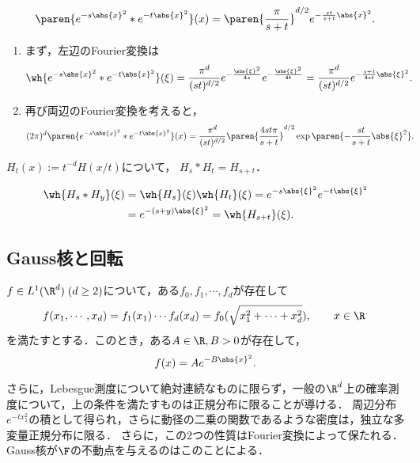 \documentclass[uplatex,dvipdfmx]{jsreport}
\begin{document}
\begin{proposition}
    \[\paren{e^{-s\abs{x}^2}*e^{-t\abs{x}^2}}(x)=\paren{\frac{\pi}{s+t}}^{d/2}e^{-\frac{st}{s+t}\abs{x}^2}.\]
\end{proposition}
\begin{Proof}\mbox{}
    \begin{enumerate}[{Step}1]
        \item まず，左辺のFourier変換は
        \begin{align*}
            \wh{e^{-s\abs{x}^2}*e^{-t\abs{x}^2}}(\xi)&=\frac{\pi^d}{(st)^{d/2}}e^{-\frac{\abs{\xi}^2}{4s}}e^{-\frac{\abs{\xi}^2}{4t}}=\frac{\pi^d}{(st)^{d/2}}e^{-\frac{s+t}{4st}\abs{\xi}^2}.
        \end{align*}
        \item 再び両辺のFourier変換を考えると，
        \begin{align*}
            (2\pi)^d\paren{e^{-s\abs{x}^2}*e^{-t\abs{x}^2}}(x)&=\frac{\pi^d}{(st)^{d/2}}\paren{\frac{4st\pi}{s+t}}^{d/2}\exp\paren{-\frac{st}{s+t}\abs{\xi}^2}.
        \end{align*}
    \end{enumerate}
\end{Proof}

\begin{proposition}[熱核の半群性]
    $H_t(x):=t^{-d}H(x/t)$について，
    $H_s*H_t=H_{s+t}$．
\end{proposition}
\begin{Proof}
    \begin{align*}
        \wh{H_s*H_y}(\xi)&=\wh{H_s}(\xi)\wh{H_t}(\xi)=e^{-s\abs{\xi}^2}e^{-t\abs{\xi}^2}\\
        &=e^{-(s+y)\abs{\xi}^2}=\wh{H_{s+t}}(\xi).
    \end{align*}
\end{Proof}

\subsection{Gauss核と回転}


\begin{proposition}
    $f\in L^1(\R^d)\;(d\ge2)$について，ある$f_0,f_1,\cdots,f_d$が存在して
    \[f(x_1,\cdots,x_d)=f_1(x_1)\cdots f_d(x_d)=f_0(\sqrt{x_1^2+\cdots+x_d^2}),\qquad x\in\R^.\]
    を満たすとする．このとき，ある$A\in\R,B>0$が存在して，
    \[f(x)=Ae^{-B\abs{x}^2}.\]
\end{proposition}
\begin{remarks}
    さらに，Lebesgue測度について絶対連続なものに限らず，一般の$\R^d$上の確率測度について，上の条件を満たすものは正規分布に限ることが導ける．
    周辺分布$e^{-tx_1^2}$の積として得られ，さらに動径の二乗の関数であるような密度は，独立な多変量正規分布に限る．
    さらに，この2つの性質はFourier変換によって保たれる．Gauss核が$\F$の不動点を与えるのはこのことによる．
\end{remarks}
\end{document}
